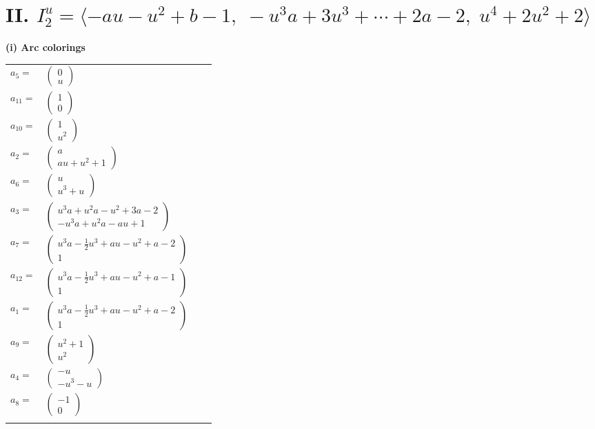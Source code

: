 \documentclass[1p]{elsarticle_modified}
\theoremstyle{definition}
\begin{document}
\centering \section*{II. $I^u_{2}= \langle - a u- u^2+b-1,\;- u^3 a+3 u^3+\cdots+2 a-2,\;u^4+2 u^2+2 \rangle$}
\flushleft \textbf{(i) Arc colorings}\\
\begin{tabular}{m{7pt} m{180pt} m{7pt} m{180pt} }
\flushright $a_{5}=$&$\begin{pmatrix}0\\u\end{pmatrix}$ \\
\flushright $a_{11}=$&$\begin{pmatrix}1\\0\end{pmatrix}$ \\
\flushright $a_{10}=$&$\begin{pmatrix}1\\u^2\end{pmatrix}$ \\
\flushright $a_{2}=$&$\begin{pmatrix}a\\a u+u^2+1\end{pmatrix}$ \\
\flushright $a_{6}=$&$\begin{pmatrix}u\\u^3+u\end{pmatrix}$ \\
\flushright $a_{3}=$&$\begin{pmatrix}u^3 a+u^2 a- u^2+3 a-2\\- u^3 a+u^2 a- a u+1\end{pmatrix}$ \\
\flushright $a_{7}=$&$\begin{pmatrix}u^3 a-\frac{1}{2} u^3+a u- u^2+a-2\\1\end{pmatrix}$ \\
\flushright $a_{12}=$&$\begin{pmatrix}u^3 a-\frac{1}{2} u^3+a u- u^2+a-1\\1\end{pmatrix}$ \\
\flushright $a_{1}=$&$\begin{pmatrix}u^3 a-\frac{1}{2} u^3+a u- u^2+a-2\\1\end{pmatrix}$ \\
\flushright $a_{9}=$&$\begin{pmatrix}u^2+1\\u^2\end{pmatrix}$ \\
\flushright $a_{4}=$&$\begin{pmatrix}- u\\- u^3- u\end{pmatrix}$ \\
\flushright $a_{8}=$&$\begin{pmatrix}-1\\0\end{pmatrix}$\\&\end{tabular}
\end{document}

